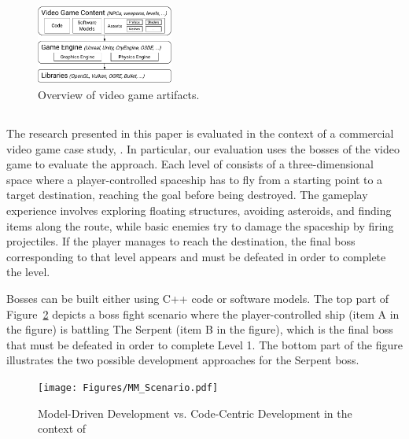 \begin{figure}[h]
    \centering
    \includegraphics[width=0.4\textwidth]{Figures/fig_bg_OverviewArtifactsVG.pdf}
    \caption{Overview of video game artifacts.}
    \label{fig:architecture}
\end{figure}

\subsection{\CaseStudy{}}

The research presented in this paper is evaluated in the context of a commercial video game case study, \CaseStudy{}. In particular, our evaluation uses the bosses of the video game to evaluate the approach. Each level of \CaseStudy{} consists of a three-dimensional space where a player-controlled spaceship has to fly from a starting point to a target destination, reaching the goal before being destroyed. The gameplay experience involves exploring floating structures, avoiding asteroids, and finding items along the route, while basic enemies try to damage the spaceship by firing projectiles. If the player manages to reach the destination, the final boss corresponding to that level appears and must be defeated in order to complete the level. 

Bosses can be built either using C++ code or software models. The top part of Figure~\ref{fig:scenario} depicts a boss fight scenario where the player-controlled ship (item A in the figure) is battling The Serpent (item B in the figure), which is the final boss that must be defeated in order to complete Level 1. The bottom part of the figure illustrates the two possible development approaches for the Serpent boss.

\begin{figure}[h]
    \centering
    \texttt{[image: Figures/MM\_Scenario.pdf]}
    \caption{Model-Driven Development vs. Code-Centric Development in the context of \CaseStudy{}}
    \label{fig:scenario}
\end{figure}

